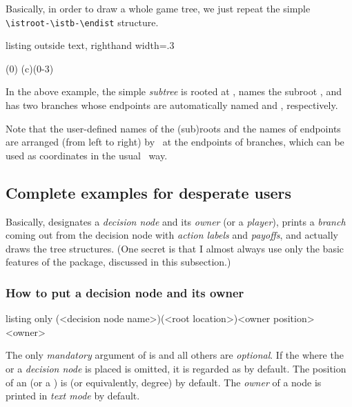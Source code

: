 Basically, in order to draw a whole game tree, we just repeat the simple \verb|\istroot-\istb-\endist| structure.

\begin{tcblisting}{listing outside text, righthand width=.3\linewidth}
\begin{istgame}
\istroot(0) %
  \istb %
  \istb %
  \istb %
  \endist %
\istroot(c)(0-3) %
  \istb %
  \istb %
  \endist
\end{istgame}
\end{tcblisting}

In the above example, the simple \emph{subtree} is rooted at , names the subroot , and has two branches whose endpoints are automatically named  and , respectively. 

Note that the user-defined names of the (sub)roots and the names of endpoints are arranged  (from left to right) by \TikZ\ at the endpoints of branches, which can be used as coordinates in the usual \TikZ\ way.

\subsection{Complete examples for desperate users}
\label{sec:desperateusers}

Basically, \cmd{\istroot} designates a \emph{decision node} and its \emph{owner} (or a \emph{player}),
\cmd{\istb} prints a \emph{branch} coming out from the decision node with \emph{action labels} and \emph{payoffs}, and \cmd{\endist} actually draws the tree structures. (One secret is that I almost always use only the basic features of the  package, discussed in this subsection.)

\subsubsection{How to put a decision node and its owner}

\begin{tcblisting}{listing only}
\istroot(<decision node name>)(<root location>)<owner position>{<owner>}
\end{tcblisting}

The only \emph{mandatory} argument of \icmd{\istroot} is  and all others are \emph{optional}.
If the  where the \emph{} or a \emph{decision node} is placed is omitted, it is regarded as  by default.
The position of an  (or a ) is  (or equivalently,  degree) by default.
The \emph{owner} of a node is printed in \emph{text mode} by default.

